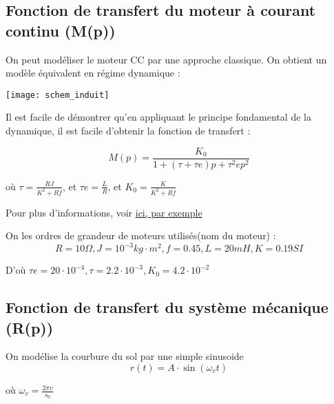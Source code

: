 \documentclass[11pt]{article} %
\begin{document}
\subsection{Fonction de transfert du moteur à courant continu (M(p))}

On peut modéliser le moteur CC par une approche classique. On obtient un modèle équivalent en régime dynamique :

\texttt{[image: schem\_induit]}

Il est facile de démontrer qu'en appliquant le principe fondamental de la dynamique, il est facile d'obtenir la fonction de transfert :


\begin{equation} M(p) = \frac{K_0}{1 + (\tau + \tau e)p + \tau^2 ep^2} \end{equation} 

où \begin{math}  \tau = \frac{RJ}{K^2 + Rf} \end{math}, et \begin{math} \tau e = \frac{L}{R}\end{math}, et \begin{math} K_0 = \frac{K}{K^2 + Rf} \end{math}

Pour plus d'informations, voir \href{http://physiquenetappliquee.free.fr/Modele_dyna_MCC.php}{ici, par exemple}

On les ordres de grandeur de moteurs utilisés(nom du moteur) : 
\begin{equation} R=10\Omega ,  J=10^{-3} kg  \cdot m^2 , f=0.45 , L =20mH , K=0.19SI \end{equation}

D'où \begin{math} \tau e = 20 \cdot 10^{-4} , \tau = 2.2 \cdot 10^{-3} , K_0 = 4.2 \cdot 10^{-2} \end{math}

\subsection{Fonction de transfert du système mécanique (R(p))}

On modélise la courbure du sol par une simple sinusoide \begin{equation}  r(t) = A \cdot \sin (\omega_v t) \end{equation}

où \begin{math} \omega_v = \frac{2\pi v}{s_0}\end{math}
\end{document}
